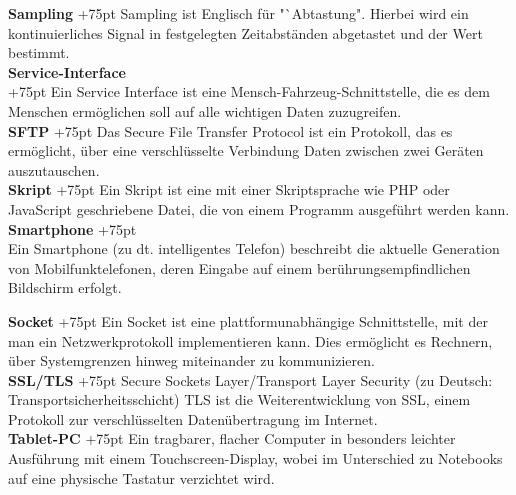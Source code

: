 \documentclass[fontsize = 12pt, paper = a4]{scrreprt}
\begin{document}
\begin{spacing}{0.95}
\textbf{Sampling}
\hangindent+75pt  
\hspace*{4.5mm}
Sampling ist Englisch für "`Abtastung". Hierbei wird ein kontinuierliches Signal in festgelegten Zeitabständen abgetastet und der Wert bestimmt.\\

\textbf{Service-Interface} \\
\hangindent+75pt  
Ein Service Interface ist eine Mensch-Fahrzeug-Schnittstelle, die es dem Menschen ermöglichen soll auf alle wichtigen Daten zuzugreifen.\\

\textbf{SFTP}
\hangindent+75pt 
\hspace*{11.25mm}
Das Secure File Transfer Protocol ist ein Protokoll, das es ermöglicht, über eine verschlüsselte Verbindung Daten zwischen zwei Geräten auszutauschen.\\

\textbf{Skript}
\hangindent+75pt 
\hspace*{10mm}
Ein Skript ist eine mit einer Skriptsprache wie PHP oder JavaScript geschriebene Datei, die von einem Programm ausgeführt werden kann.\\

\textbf{Smartphone}
\hangindent+75pt  \\
Ein Smartphone (zu dt. intelligentes Telefon) beschreibt die aktuelle Gene\-ration von Mobilfunktelefonen, deren Eingabe auf einem berührungsempfindlichen Bildschirm erfolgt.\\

\end{spacing}

\textbf{Socket}
\hangindent+75pt 
\hspace*{10mm}
Ein Socket ist eine plattformunabhängige Schnittstelle, mit der man ein Netzwerkprotokoll implementieren kann. Dies ermöglicht es Rechnern, über Systemgrenzen hinweg miteinander zu kommunizieren.\\

\textbf{SSL/TLS}
\hangindent+75pt 
\hspace*{4.5mm}
Secure Sockets Layer/Transport Layer Security (zu Deutsch: Transportsicherheitsschicht) TLS ist die Weiterentwicklung von SSL, einem Protokoll zur verschlüsselten Datenübertragung im Internet.\\

\textbf{Tablet-PC}
\hangindent+75pt  
\hspace*{3mm}
Ein tragbarer, flacher Computer in besonders leichter Ausführung mit einem Touchscreen-Display, wobei im Unterschied zu Notebooks auf eine physische Tastatur verzichtet wird.\\
\end{document}
